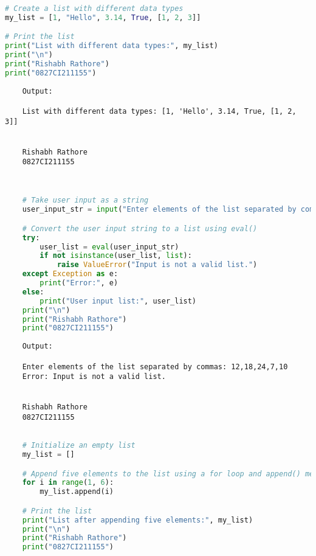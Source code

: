 \documentclass{report}
\begin{document}
\sol{}
\begin{lstlisting}[language=Python]
# Create a list with different data types
my_list = [1, "Hello", 3.14, True, [1, 2, 3]]

# Print the list
print("List with different data types:", my_list)
print("\n")
print("Rishabh Rathore")
print("0827CI211155")
\end{lstlisting}

\begin{verbatim}
	Output:

	List with different data types: [1, 'Hello', 3.14, True, [1, 2, 3]]


	Rishabh Rathore
	0827CI211155
	
\end{verbatim}
\newpage


\sol{}
\begin{lstlisting}[language=Python]

	# Take user input as a string
	user_input_str = input("Enter elements of the list separated by commas: ")

	# Convert the user input string to a list using eval()
	try:
		user_list = eval(user_input_str)
		if not isinstance(user_list, list):
			raise ValueError("Input is not a valid list.")
	except Exception as e:
		print("Error:", e)
	else:
		print("User input list:", user_list)
	print("\n")
	print("Rishabh Rathore")
	print("0827CI211155")
\end{lstlisting}

\begin{verbatim}
	Output:

	Enter elements of the list separated by commas: 12,18,24,7,10
	Error: Input is not a valid list.
	
	
	Rishabh Rathore
	0827CI211155
\end{verbatim}
\newpage


\sol{}
\begin{lstlisting}[language=Python]

	# Initialize an empty list
	my_list = []

	# Append five elements to the list using a for loop and append() method
	for i in range(1, 6):
		my_list.append(i)

	# Print the list
	print("List after appending five elements:", my_list)
	print("\n")
	print("Rishabh Rathore")
	print("0827CI211155")

\end{lstlisting}
\end{document}
